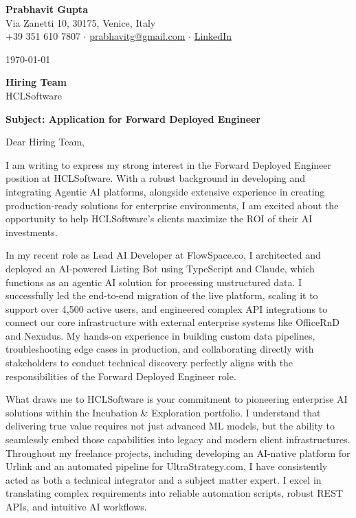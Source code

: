 \documentclass[11pt,a4paper]{article}
\begin{document}
\begin{center}
    {\LARGE \textbf{Prabhavit Gupta}} \\
    \vspace{2mm}
    Via Zanetti 10, 30175, Venice, Italy \\
    +39 351 610 7807 $\cdot$ \href{mailto:prabhavitg@gmail.com}{prabhavitg@gmail.com} $\cdot$ \href{https://www.linkedin.com/in/prabhavit/}{LinkedIn}
\end{center}

\vspace{5mm}
\today

\vspace{5mm}
\textbf{Hiring Team} \\
HCLSoftware \\
\vspace{5mm}

\textbf{Subject: Application for Forward Deployed Engineer}

\vspace{5mm}
Dear Hiring Team,

I am writing to express my strong interest in the Forward Deployed Engineer position at HCLSoftware. With a robust background in developing and integrating Agentic AI platforms, alongside extensive experience in creating production-ready solutions for enterprise environments, I am excited about the opportunity to help HCLSoftware's clients maximize the ROI of their AI investments.

In my recent role as Lead AI Developer at FlowSpace.co, I architected and deployed an AI-powered Listing Bot using TypeScript and Claude, which functions as an agentic AI solution for processing unstructured data. I successfully led the end-to-end migration of the live platform, scaling it to support over 4,500 active users, and engineered complex API integrations to connect our core infrastructure with external enterprise systems like OfficeRnD and Nexudus. My hands-on experience in building custom data pipelines, troubleshooting edge cases in production, and collaborating directly with stakeholders to conduct technical discovery perfectly aligns with the responsibilities of the Forward Deployed Engineer role.

What draws me to HCLSoftware is your commitment to pioneering enterprise AI solutions within the Incubation \& Exploration portfolio. I understand that delivering true value requires not just advanced ML models, but the ability to seamlessly embed those capabilities into legacy and modern client infrastructures. Throughout my freelance projects, including developing an AI-native platform for Urlink and an automated pipeline for UltraStrategy.com, I have consistently acted as both a technical integrator and a subject matter expert. I excel in translating complex requirements into reliable automation scripts, robust REST APIs, and intuitive AI workflows.
\end{document}
